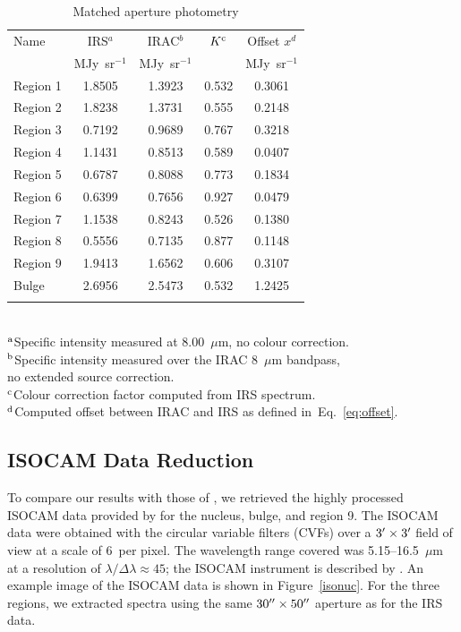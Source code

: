 \begin{table}
 \centering
 \begin{minipage}{100mm}
\caption{Matched aperture photometry}
  \begin{tabular}{lcccc}
  \hline{Name}&{IRS$^{a}$}&{IRAC$^{b}$}&{$K^{\rm c}$}&{Offset $x^d$} \\ 
{} & { MJy~sr$^{-1}$} & { MJy~sr$^{-1}$} & &  MJy~sr$^{-1}$
   \\
 \hline
 Region 1 & 1.8505 & 1.3923 & 0.532 & 0.3061
 \\ Region 2  & 1.8238 & 1.3731 & 0.555 & 0.2148
 \\ Region 3 & 0.7192 & 0.9689 & 0.767 & 0.3218
 \\ Region 4 & 1.1431 & 0.8513 & 0.589 & 0.0407
 \\  Region 5 & 0.6787 & 0.8088 & 0.773 & 0.1834
 \\  Region 6  & 0.6399 & 0.7656 & 0.927 & 0.0479
 \\  Region 7  & 1.1538 & 0.8243 & 0.526 & 0.1380
 \\ Region 8 & 0.5556 & 0.7135 & 0.877 & 0.1148
 \\  Region 9 & 1.9413 & 1.6562 & 0.606 & 0.3107 
 \\ Bulge & 2.6956 & 2.5473 & 0.532 & 1.2425\\
\hline
 \label{colourK}
\end{tabular}\\
 {$^{\rm a}$Specific intensity measured at 8.00~$\mu$m, no colour correction.\\
 $^{\rm b}$Specific intensity measured over the IRAC 8~$\mu$m bandpass,\\ no extended source correction.\\
$^{\rm c}$Colour correction factor computed from IRS spectrum.\\
 $^{\rm d}$Computed offset between IRAC and IRS as defined in~Eq.~\ref{eq:offset}. }
\end{minipage}
\end{table}

	


\subsection{ISOCAM Data Reduction}
\label{sect:iso_data}

To compare our results with those of  \citet{1998Cesarsky}, we retrieved the highly processed ISOCAM data provided by \citet{Boulanger_F_2005}  
for the nucleus, bulge, and region 9. 
The ISOCAM data were obtained with the circular variable filters (CVFs) over a $3\hbox{$^\prime$} \times 3\hbox{$^\prime$}$ field of view at a scale of 6\arcsec\ per pixel. 
The wavelength range covered was 5.15--16.5~$\mu$m at a resolution of $\lambda/\Delta \lambda \approx 45$; the ISOCAM instrument is described by \citet{cesarsky1996}.
An example image of the ISOCAM data is shown in Figure~\ref{isonuc}.  For the three regions, we extracted spectra using the same 
$30\hbox{$^{\prime\prime}$}\times50\hbox{$^{\prime\prime}$}$ aperture as for the IRS data. 

